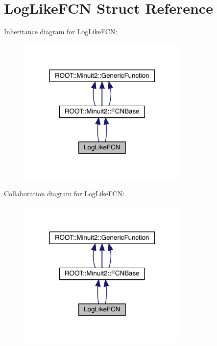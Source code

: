 \hypertarget{structLogLikeFCN}{}\section{Log\+Like\+F\+CN Struct Reference}
\label{structLogLikeFCN}


Inheritance diagram for Log\+Like\+F\+CN\+:
\nopagebreak
\begin{figure}[H]
\begin{center}
\leavevmode
\includegraphics[width=240pt]{d6/d76/structLogLikeFCN__inherit__graph}
\end{center}
\end{figure}


Collaboration diagram for Log\+Like\+F\+CN\+:
\nopagebreak
\begin{figure}[H]
\begin{center}
\leavevmode
\includegraphics[width=240pt]{d9/dbb/structLogLikeFCN__coll__graph}
\end{center}
\end{figure}
